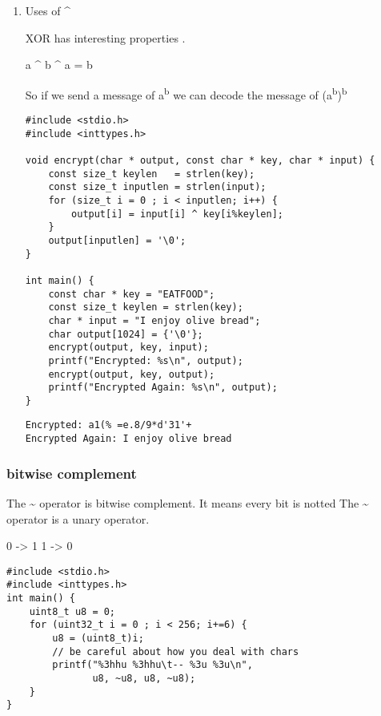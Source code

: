 \documentclass[11pt]{article}
\begin{document}
\begin{enumerate}
\item Uses of \^{}
\label{sec:org19b4855}

XOR has interesting properties .

a \^{} b \^{} a = b

So if we send a message of a\textsuperscript{b} we can decode the message of (a\textsuperscript{b})\textsuperscript{b}

\begin{verbatim}
#include <stdio.h>
#include <inttypes.h>

void encrypt(char * output, const char * key, char * input) {
    const size_t keylen   = strlen(key);
    const size_t inputlen = strlen(input);
    for (size_t i = 0 ; i < inputlen; i++) {
        output[i] = input[i] ^ key[i%keylen];
    }
    output[inputlen] = '\0';   
}

int main() {  
    const char * key = "EATFOOD";
    const size_t keylen = strlen(key);
    char * input = "I enjoy olive bread";
    char output[1024] = {'\0'};
    encrypt(output, key, input);
    printf("Encrypted: %s\n", output);
    encrypt(output, key, output);
    printf("Encrypted Again: %s\n", output);
}
\end{verbatim}

\begin{verbatim}
Encrypted: a1(% =e.8/9*d'31'+
Encrypted Again: I enjoy olive bread
\end{verbatim}
\end{enumerate}

\subsubsection{bitwise complement}
\label{sec:org0125f7f}

The \textasciitilde{} operator is bitwise complement. It means every bit is notted
The \textasciitilde{} operator is a unary operator.

0 -> 1
1 -> 0

\begin{verbatim}
#include <stdio.h>
#include <inttypes.h>
int main() {
    uint8_t u8 = 0;
    for (uint32_t i = 0 ; i < 256; i+=6) {
        u8 = (uint8_t)i;
        // be careful about how you deal with chars
        printf("%3hhu %3hhu\t-- %3u %3u\n",
               u8, ~u8, u8, ~u8);
    }
}
\end{verbatim}
\end{document}

